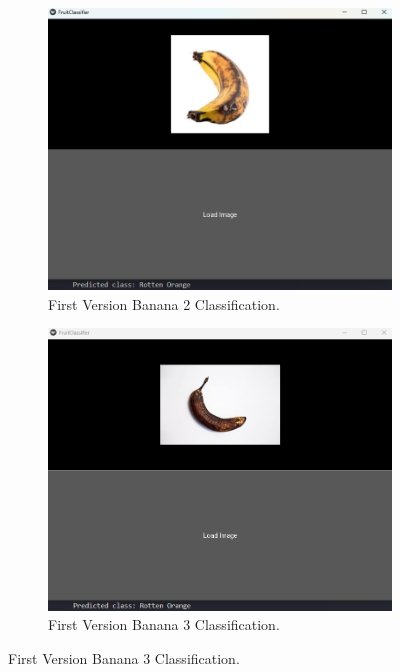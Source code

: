\documentclass[conference]{IEEEtran}
\begin{document}
\begin{figure}[h]
\begin{subfigure}[b]{0.48\linewidth}
        \label{figFA}
    \end{subfigure}
    \hfill
    \begin{subfigure}[b]{0.48\linewidth}
        \centering
        \includegraphics[width=\linewidth]{1layer bananaR2.png}
        \caption{First Version Banana 2 Classification.}
        \label{figFB}
    \end{subfigure}
    \hfill
    \begin{subfigure}[b]{0.48\linewidth}
        \centering
        \includegraphics[width=\linewidth]{1layer bananaR3.png}
        \caption{First Version Banana 3 Classification.}

\end{subfigure}
\end{figure}
\end{document}
